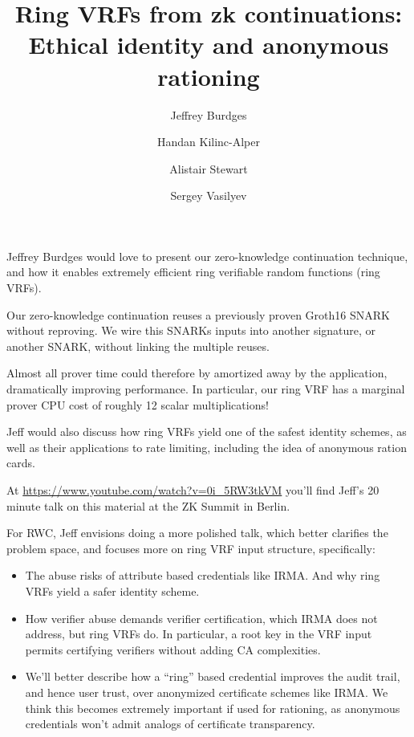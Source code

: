 \documentclass{article}
\title{Ring VRFs from zk continuations: \\ Ethical identity and anonymous rationing}
\author{Jeffrey Burdges \and Handan Kilinc-Alper \and Alistair Stewart \and Sergey Vasilyev}
\date{}
\begin{document}
\maketitle

Jeffrey Burdges would love to present our zero-knowledge continuation
technique, and how it enables extremely efficient ring verifiable
random functions (ring VRFs).

\smallskip

Our zero-knowledge continuation reuses a previously proven Groth16 SNARK
without reproving.  We wire this SNARKs inputs into another signature,
or another SNARK, without linking the multiple reuses.

\smallskip

Almost all prover time could therefore by amortized away by the application,
dramatically improving performance.  In particular, our ring VRF has a marginal
prover CPU cost of roughly 12 scalar multiplications!

\smallskip

Jeff would also discuss how ring VRFs yield one of the safest identity
schemes, as well as their applications to rate limiting,
including the idea of anonymous ration cards.

\medskip

At \quad \url{https://www.youtube.com/watch?v=0i_5RW3tkVM} \quad you'll
find Jeff's 20 minute talk on this material at the
ZK Summit in Berlin.

\medskip

For RWC, Jeff envisions doing a more polished talk, which better clarifies
the problem space, and focuses more on ring VRF input structure,
specifically:
\begin{itemize}
\item The abuse risks of attribute based credentials like IRMA.
 And why ring VRFs yield a safer identity scheme.
\item How verifier abuse demands verifier certification, which IRMA does
 not address, but ring VRFs do.  In particular, a root key in the VRF input
 permits certifying verifiers without adding CA complexities.
\item We'll better describe how a ``ring'' based credential improves
 the audit trail, and hence user trust, over anonymized certificate schemes
 like IRMA.  We think this becomes extremely important if used for rationing,
 as anonymous credentials won't admit analogs of certificate transparency.
\end{itemize}
\end{document}
